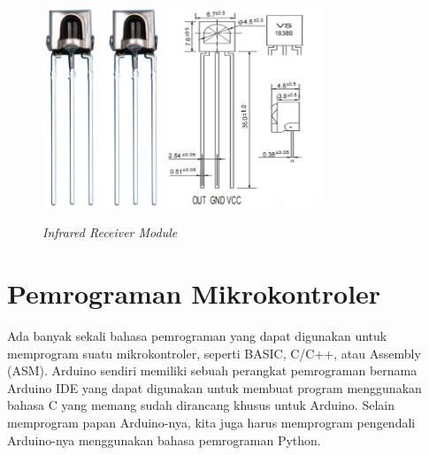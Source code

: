 \begin{figure}[H]
	\centerline {
		\includegraphics[height=6cm]{bab3/img/ir-receiver2.png}
		\includegraphics[height=6cm]{bab3/img/ir-receiver4.png}
	}
	\caption{\textit{Infrared Receiver Module}}
	\label{figure:ir-receiver4}
\end{figure}

\section{Pemrograman Mikrokontroler}
\tab Ada banyak sekali bahasa pemrograman yang dapat digunakan untuk memprogram suatu mikrokontroler, seperti BASIC, C/C++, atau Assembly (ASM). Arduino sendiri memiliki sebuah perangkat pemrograman bernama Arduino IDE yang dapat digunakan untuk membuat program menggunakan bahasa C yang memang sudah dirancang khusus untuk Arduino. Selain memprogram papan Arduino-nya, kita juga harus memprogram pengendali Arduino-nya menggunakan bahasa pemrograman Python. 

